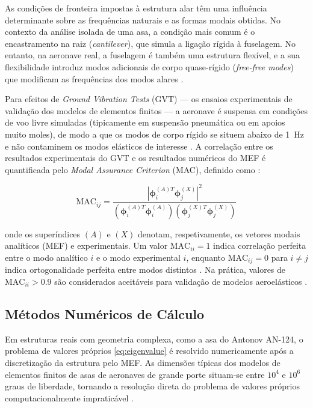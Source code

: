 \documentclass[11pt,twoside,a4paper]{report}
\begin{document}
As condições de fronteira impostas à estrutura alar têm uma influência determinante sobre as frequências naturais e as formas modais obtidas. No contexto da análise isolada de uma asa, a condição mais comum é o encastramento na raiz (\textit{cantilever}), que simula a ligação rígida à fuselagem. No entanto, na aeronave real, a fuselagem é também uma estrutura flexível, e a sua flexibilidade introduz modos adicionais de corpo quase-rígido (\textit{free-free modes}) que modificam as frequências dos modos alares \cite{Wright2015}.

Para efeitos de \textit{Ground Vibration Tests} (GVT) --- os ensaios experimentais de validação dos modelos de elementos finitos --- a aeronave é suspensa em condições de voo livre simuladas (tipicamente em suspensão pneumática ou em apoios muito moles), de modo a que os modos de corpo rígido se situem abaixo de \SI{1}{\hertz} e não contaminem os modos elásticos de interesse \cite{Ewins2000}. A correlação entre os resultados experimentais do GVT e os resultados numéricos do MEF é quantificada pelo \textit{Modal Assurance Criterion} (MAC), definido como \cite{Allemang1982}:

\begin{equation}
    \text{MAC}_{ij} = \frac{\left| \boldsymbol{\phi}_i^{(A)T} 
    \boldsymbol{\phi}_j^{(X)} \right|^2}
    {\left( \boldsymbol{\phi}_i^{(A)T} \boldsymbol{\phi}_i^{(A)} 
    \right)
    \left( \boldsymbol{\phi}_j^{(X)T} \boldsymbol{\phi}_j^{(X)} 
    \right)}
    \label{eq:mac}
\end{equation}

\noindent onde os superíndices $(A)$ e $(X)$ denotam, respetivamente, os vetores modais analíticos (MEF) e experimentais. Um valor $\text{MAC}_{ii} = 1$ indica correlação perfeita entre o modo analítico $i$ e o modo experimental $i$, enquanto $\text{MAC}_{ij} = 0$ para $i \neq j$ indica ortogonalidade perfeita entre modos distintos \cite{Allemang1982, Ewins2000}. Na prática, valores de $\text{MAC}_{ii} > 0.9$ são considerados aceitáveis para validação de modelos aeroelásticos \cite{EASA2022}.

\subsection{Métodos Numéricos de Cálculo}

Em estruturas reais com geometria complexa, como a asa do Antonov AN-124, o problema de valores próprios \eqref{eq:eigenvalue} é resolvido numericamente após a discretização da estrutura pelo MEF. As dimensões típicas dos modelos de elementos finitos de asas de aeronaves de grande porte situam-se entre $10^4$ e $10^6$ graus de liberdade, tornando a resolução direta do problema de valores próprios computacionalmente impraticável \cite{Nastran2014}.
\end{document}
